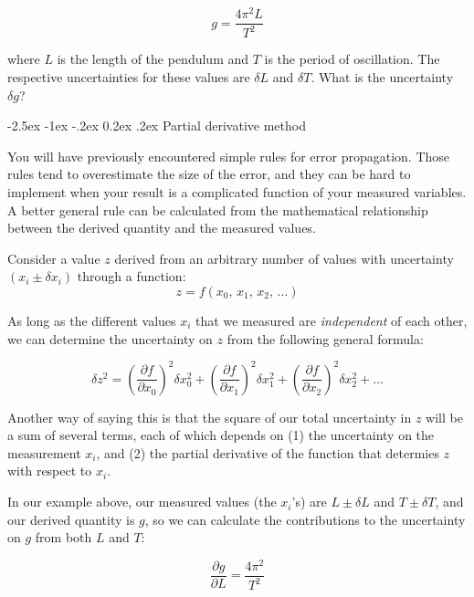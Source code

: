 \documentclass[11pt]{article}
\makeatletter
\renewcommand\subsection{\@startsection {subsection}{2}{\z@}%
     {-2.5ex \@plus -1ex \@minus -.2ex}%
     {0.2ex \@plus.2ex}%
    {\bfseries\large}}
\makeatother
\begin{document}
\begin{equation}
 g = \frac{4\pi^2L}{T^2}
 \label{eq: g from pendulum}
\end{equation}

where $L$ is the length of the pendulum and $T$ is the period of oscillation.
The respective uncertainties for these values are $\delta L$ and $\delta T$.
What is the uncertainty $\delta g$?

\subsection{Partial derivative method}

You will have previously encountered simple rules for error propagation. Those
rules tend to overestimate the size of the error, and they can be hard to implement 
when your result is a complicated function of your measured variables. A better general 
rule can be calculated from the mathematical relationship between the derived quantity 
and the measured values.

Consider a value $z$ derived from an arbitrary number of values with uncertainty 
$(x_{i} \pm \delta x_{i})$ through a function:
\begin{equation}
  z = f(x_{0},\, x_{1},\, x_{2},\, \ldots)
\end{equation}

As long as the different values $x_i$ that we measured are \textit{independent} of each other, 
we can determine the uncertainty on $z$ from the following general formula:

\begin{equation}
  \boxed{\delta z^{2} = \left(\frac{\partial f}{\partial x_{0}}\right)^{2}\delta 
    x_{0}^{2} + \left(\frac{\partial f}{\partial x_{1}}\right)^{2}\delta x_{1}^{2} 
    + \left(\frac{\partial f}{\partial x_{2}}\right)^{2}\delta x_{2}^{2} +  \ldots}
\end{equation}

Another way of saying this is that the square of our total uncertainty in $z$ will be a sum of several terms, each of which depends on (1) the uncertainty on the measurement $x_i$, and (2) the partial derivative of the function that determies $z$ with respect to $x_i$.

In our example above, our measured values (the $x_i$'s) are $L\pm\delta L$ and $T\pm\delta T$, and our derived quantity is $g$, so we can calculate the contributions to the uncertainty on $g$ from both $L$ and $T$:

\begin{equation}
  \frac{\partial g}{\partial L} = \frac{4\pi^2}{T^2}
\end{equation}
\end{document}
